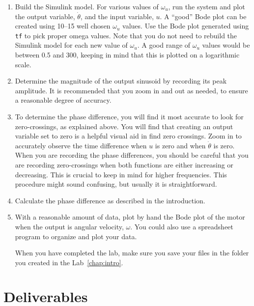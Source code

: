 \begin{enumerate}
\item Build the \textsf{Simulink} model.  For various values of $\omega_u$, run
the system and plot the output variable, $\dot\theta$\@, and the input
variable, $u$\@.  A ``good'' Bode plot can be created using 10--15 well
chosen $\omega_u$ values.  Use the Bode plot generated using \verb|tf| to pick
proper omega values. Note that you do not need to rebuild the \textsf{Simulink} 
model for each new value of $\omega_u$. A good range of $\omega_u$ values would 
be between 0.5 and 300, keeping in mind that this is plotted on a logarithmic scale.%

\item Determine the magnitude of the output sinusoid by recording its peak
amplitude.  It is recommended that you zoom in and out as needed, to ensure a
reasonable degree of accuracy.

\item To determine the phase difference, you will find it most accurate to
look for zero-crossings, as explained above.  You will find that creating an
output variable set to zero is a helpful visual aid in find zero crossings.
Zoom in to accurately observe the time difference when $u$ is zero and when
$\dot\theta$ is zero.  When you are recording the phase differences, you
should be careful that you are recording zero-crossings when both functions are either
increasing or decreasing. This is crucial to keep in mind for higher frequencies.
 This procedure might sound confusing, but usually it is straightforward.%

\item Calculate the phase difference as described in the introduction.

\item With a reasonable amount of data, plot by hand the Bode plot of the
motor when the output is angular velocity, $\omega$. You could also use a
spreadsheet program to organize and plot your data.

When you have completed the lab, make sure you save your files in the folder
you created in the Lab~\ref{chap:intro}\@.
\end{enumerate}

\section{Deliverables}

